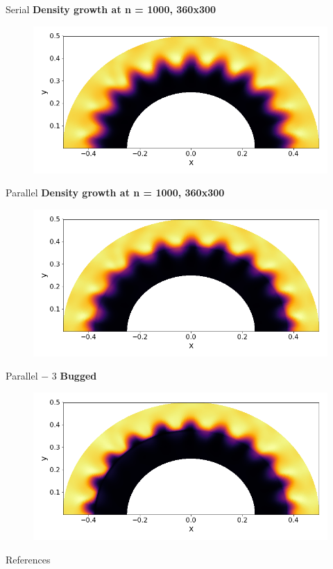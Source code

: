 \begin{frame}[t]{Serial}
  \textbf{Density growth at n = 1000, 360x300}
 \begin{figure}[!htbp]
   \includegraphics[width=0.85\linewidth]{fig/360x300serial}
   \centering
 \end{figure}
\end{frame}

\begin{frame}[t]{Parallel}
  \textbf{Density growth at n = 1000, 360x300}
 \begin{figure}[!htbp]
   \includegraphics[width=0.85\linewidth]{fig/360x300parr2}
   \centering
 \end{figure}
\end{frame}




\begin{frame}[t]{Parallel $-$ 3}
 \textbf{Bugged}
 \begin{figure}[!htbp]
   \includegraphics[width=0.85\linewidth]{fig/360x300parr}
   \centering
 \end{figure}
\end{frame}

\begin{frame}[t,fragile]{References}

  \tiny
  
  
\end{frame}





\backupend






